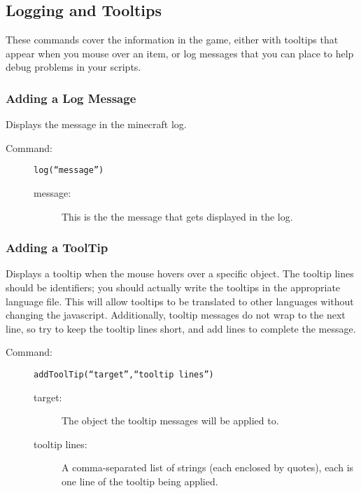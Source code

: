 \documentclass[letterpaper,titlepage,12pt]{article}
\begin{document}
\subsection{Logging and Tooltips}

These commands cover the information in the game, either with tooltips that appear when you mouse over an item, or log messages that you can place to help debug problems in your scripts.

\subsubsection{Adding a Log Message}

Displays the message in the minecraft log.

\begin{description}
\item[Command:] \texttt{log(``\emph{message}'')}

\begin{description}
\item [message:] This is the the message that gets displayed in the log.
\end{description}
\end{description}

\subsubsection{Adding a ToolTip}

Displays a tooltip when the mouse hovers over a specific object.  The tooltip lines should be identifiers; you should actually write the tooltips in the appropriate language file.  This will allow tooltips to be translated to other languages without changing the javascript.  Additionally, tooltip messages do not wrap to the next line, so try to keep the tooltip lines short, and add lines to complete the message.

\begin{description}
\item[Command:] \texttt{addToolTip(``\emph{target}'',``\emph{tooltip lines}'')}

\begin{description}
\item [target:] The object the tooltip messages will be applied to.
\item [tooltip lines:] A comma-separated list of strings (each enclosed by quotes), each is one line of the tooltip being applied.
\end{description}
\end{description}
\end{document}
